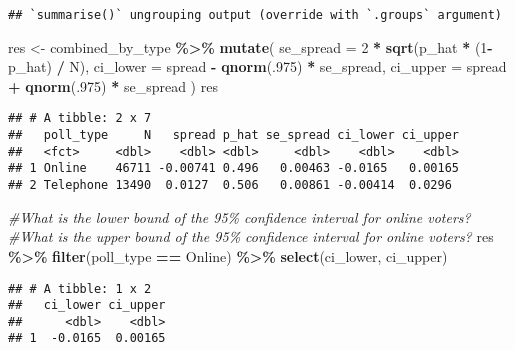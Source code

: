 \documentclass[
]{article}
\newenvironment{Shaded}{\begin{snugshade}}{\end{snugshade}}
\newcommand{\CommentTok}[1]{\textcolor[rgb]{0.56,0.35,0.01}{\textit{#1}}}
\newcommand{\DataTypeTok}[1]{\textcolor[rgb]{0.13,0.29,0.53}{#1}}
\newcommand{\DecValTok}[1]{\textcolor[rgb]{0.00,0.00,0.81}{#1}}
\newcommand{\KeywordTok}[1]{\textcolor[rgb]{0.13,0.29,0.53}{\textbf{#1}}}
\newcommand{\NormalTok}[1]{#1}
\newcommand{\OperatorTok}[1]{\textcolor[rgb]{0.81,0.36,0.00}{\textbf{#1}}}
\newcommand{\StringTok}[1]{\textcolor[rgb]{0.31,0.60,0.02}{#1}}
\begin{document}
\begin{verbatim}
## `summarise()` ungrouping output (override with `.groups` argument)
\end{verbatim}

\begin{Shaded}
\begin{Highlighting}[]
\NormalTok{res \textless{}{-}}\StringTok{ }\NormalTok{combined\_by\_type }\OperatorTok{\%\textgreater{}\%}
\StringTok{  }\KeywordTok{mutate}\NormalTok{(}
    \DataTypeTok{se\_spread =} \DecValTok{2} \OperatorTok{*}\StringTok{ }\KeywordTok{sqrt}\NormalTok{(p\_hat }\OperatorTok{*}\StringTok{ }\NormalTok{(}\DecValTok{1}\OperatorTok{{-}}\NormalTok{p\_hat) }\OperatorTok{/}\StringTok{ }\NormalTok{N),}
    \DataTypeTok{ci\_lower =}\NormalTok{ spread }\OperatorTok{{-}}\StringTok{ }\KeywordTok{qnorm}\NormalTok{(.}\DecValTok{975}\NormalTok{) }\OperatorTok{*}\StringTok{ }\NormalTok{se\_spread,}
    \DataTypeTok{ci\_upper =}\NormalTok{ spread }\OperatorTok{+}\StringTok{ }\KeywordTok{qnorm}\NormalTok{(.}\DecValTok{975}\NormalTok{) }\OperatorTok{*}\StringTok{ }\NormalTok{se\_spread}
\NormalTok{    )}
\NormalTok{res}
\end{Highlighting}
\end{Shaded}

\begin{verbatim}
## # A tibble: 2 x 7
##   poll_type     N   spread p_hat se_spread ci_lower ci_upper
##   <fct>     <dbl>    <dbl> <dbl>     <dbl>    <dbl>    <dbl>
## 1 Online    46711 -0.00741 0.496   0.00463 -0.0165   0.00165
## 2 Telephone 13490  0.0127  0.506   0.00861 -0.00414  0.0296
\end{verbatim}

\begin{Shaded}
\begin{Highlighting}[]
\CommentTok{\#What is the lower bound of the 95\% confidence interval for online voters?}
\CommentTok{\#What is the upper bound of the 95\% confidence interval for online voters?}
\NormalTok{res }\OperatorTok{\%\textgreater{}\%}
\StringTok{  }\KeywordTok{filter}\NormalTok{(poll\_type }\OperatorTok{==}\StringTok{ \textquotesingle{}Online\textquotesingle{}}\NormalTok{) }\OperatorTok{\%\textgreater{}\%}
\StringTok{  }\KeywordTok{select}\NormalTok{(ci\_lower, ci\_upper)}
\end{Highlighting}
\end{Shaded}

\begin{verbatim}
## # A tibble: 1 x 2
##   ci_lower ci_upper
##      <dbl>    <dbl>
## 1  -0.0165  0.00165
\end{verbatim}
\end{document}
